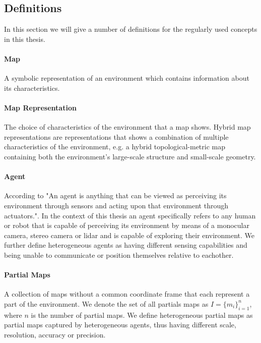 
\subsection{Definitions}
In this section we will give a number of definitions for the regularly used concepts in this thesis.

\paragraph{Map} A symbolic representation of an environment which contains information about its characteristics. 

\paragraph{Map Representation} The choice of characteristics of the environment that a map shows. Hybrid map representations are representations that shows a combination of multiple characteristics of the environment, e.g. a hybrid topological-metric map containing both the environment's large-scale structure and small-scale geometry.

\paragraph{Agent} According to \citet{russell_artificial_2010} "An agent is anything that can be viewed as perceiving its environment through sensors and
acting upon that environment through actuators.". In the context of this thesis an agent specifically refers to any human or robot that is capable of perceiving its environment by means of a monocular camera, stereo camera or lidar and is capable of exploring their environment. We further define heterogeneous agents as having different sensing capabilities and being unable to communicate or position themselves relative to eachother.

\paragraph{Partial Maps} A collection of maps without a common coordinate frame that each represent a part of the environment. We denote the set of all partials maps as \(I = \{m_i\}_{i=1}^n\), where \(n\) is the number of partial maps. We define heterogeneous partial maps as partial maps captured by heterogeneous agents, thus having different scale, resolution, accuracy or precision.

